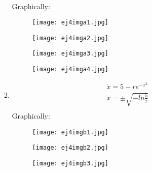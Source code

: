\documentclass[a4paper,10pt]{article}
\begin{document}
\begin{enumerate}
\begin{enumerate}
\begin{equation}
\begin{aligned}
                    \end{aligned}
                \end{equation}
                \newpage
                Graphically:
                \begin{figure}[h]
                    \centering
                    \texttt{[image: ej4imga1.jpg]}
                    \label{fig:mesh1}
                \end{figure}
                \begin{figure}[h]
                    \centering
                    \texttt{[image: ej4imga2.jpg]}
                    \label{fig:mesh1}
                \end{figure}
                \newpage
                \begin{figure}[h]
                    \centering
                    \texttt{[image: ej4imga3.jpg]}
                    \label{fig:mesh1}
                \end{figure}
                \begin{figure}[h]
                    \centering
                    \texttt{[image: ej4imga4.jpg]}
                    \label{fig:mesh1}
                \end{figure}
                
            \item
                \begin{equation}
                    \begin{aligned}
                        \dot{x}= 5- re^{-x^{2}}\\
                        x= \pm\sqrt{-ln\frac{5}{r}}\\
                        
                    \end{aligned}
                \end{equation}
                \newpage
                Graphically:
                
                \begin{figure}[h]
                    \centering
                    \texttt{[image: ej4imgb1.jpg]}
                    \label{fig:mesh1}
                \end{figure}
                
                \begin{figure}[h]
                    \centering
                    \texttt{[image: ej4imgb2.jpg]}
                    \label{fig:mesh1}
                \end{figure}
                \newpage
                \begin{figure}[h]
                    \centering
                    \texttt{[image: ej4imgb3.jpg]}
                    \label{fig:mesh1}
                \end{figure}
                

\end{enumerate}
\end{enumerate}
\end{document}
